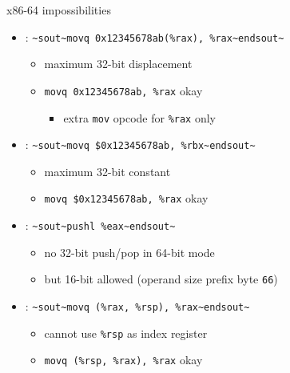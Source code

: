 
\begin{frame}[fragile,label=x8664impos]{x86-64 impossibilities}
    \begin{itemize}
    \item {}: \lstinline|~sout~movq 0x12345678ab(%rax), %rax~endsout~|
        \begin{itemize}
        \item maximum 32-bit displacement
        \item \lstinline|movq 0x12345678ab, %rax| okay
            \begin{itemize}
            \item extra {\tt mov} opcode for {\tt \%rax} only
            \end{itemize}
        \end{itemize}
    \item {}: \lstinline|~sout~movq $0x12345678ab, %rbx~endsout~|
        \begin{itemize}
        \item maximum 32-bit constant
        \item \lstinline|movq $0x12345678ab, %rax| okay
        \end{itemize}
    \item {}: \lstinline|~sout~pushl %eax~endsout~|
        \begin{itemize}
        \item no 32-bit push/pop in 64-bit mode
        \item but 16-bit allowed (operand size prefix byte {\tt 66})
        \end{itemize}
    \item {}: \lstinline|~sout~movq (%rax, %rsp), %rax~endsout~|
        \begin{itemize}
        \item cannot use \lstinline|%rsp| as index register
        \item \lstinline|movq (%rsp, %rax), %rax| okay
        \end{itemize}
    \end{itemize}
\end{frame}

